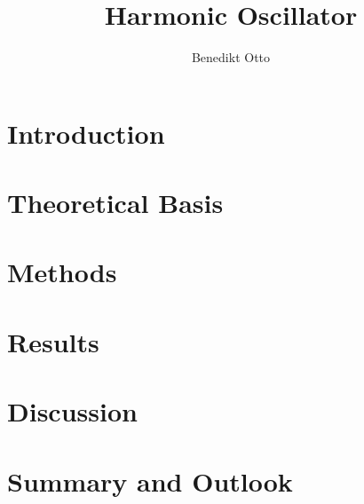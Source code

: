 \documentclass{article}
\title{Harmonic Oscillator}
\author{Benedikt Otto}
\begin{document}
	\maketitle
	\newpage
	\begin{abstract}
	\end{abstract}
	\section{Introduction}
	\section{Theoretical Basis}
	\section{Methods}
	\section{Results}
	\section{Discussion}
	\section{Summary and Outlook}
\end{document}
